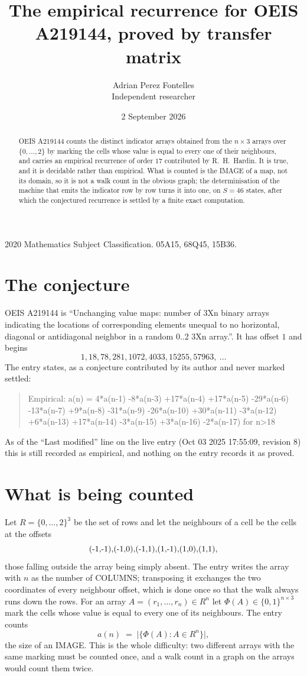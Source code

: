 \documentclass[11pt,a4paper]{article}
\title{The empirical recurrence for OEIS A219144, proved by transfer matrix}
\author{Adrian Perez Fontelles\\ \small Independent researcher}
\date{2 September 2026}
\theoremstyle{plain}
\theoremstyle{definition}
\begin{document}
\maketitle

\begin{abstract}
OEIS A219144 counts the distinct indicator arrays obtained from the $n\times3$ arrays over
$\{0,\dots,2\}$ by marking the cells whose value is equal to every one of their neighbours, and carries an
empirical recurrence of order $17$ contributed by R.~H.~Hardin. It is true, and it is
decidable rather than empirical. What is counted is the IMAGE of a map, not its domain, so it
is not a walk count in the obvious graph; the determinisation of the machine that emits the
indicator row by row turns it into one, on $S=46$ states, after which the conjectured
recurrence is settled by a finite exact computation.
\end{abstract}

\noindent\small 2020 Mathematics Subject Classification. 05A15, 68Q45, 15B36.\normalsize

\section{The conjecture}

OEIS A219144 is ``Unchanging value maps: number of 3Xn binary arrays indicating the locations of corresponding elements unequal to no horizontal, diagonal or antidiagonal neighbor in a random 0..2 3Xn array.''. It has offset $1$ and begins
\[
1, 18, 78, 281, 1072, 4033, 15255, 57963,\ \dots
\]
The entry states, as a conjecture contributed by its author and never marked settled:
\begin{quote}
Empirical: a(n) = 4*a(n-1) -8*a(n-3) +17*a(n-4) +17*a(n-5) -29*a(n-6) -13*a(n-7) +9*a(n-8) -31*a(n-9) -26*a(n-10) +30*a(n-11) -3*a(n-12) +6*a(n-13) +17*a(n-14) -3*a(n-15) +3*a(n-16) -2*a(n-17) for n>18
\end{quote}
As of the ``Last modified'' line on the live entry (Oct 03 2025 17:55:09, revision 8) this is still
recorded as empirical, and nothing on the entry records it as proved.

\section{What is being counted}

Let $R=\{0,\dots,2\}^{3}$ be the set of rows and let the neighbours of a cell be the
cells at the offsets
\[
$(-1,-1)$, $(-1,0)$, $(-1,1)$, $(1,-1)$, $(1,0)$, $(1,1)$,
\]
those falling outside the array being simply absent. The entry writes the array with $n$ as the number of COLUMNS; transposing it exchanges the two coordinates of every neighbour offset, which is done once so that the walk always runs down the rows. For an array
$A=(r_1,\dots,r_n)\in R^n$ let $\Phi(A)\in\{0,1\}^{n\times3}$ mark the cells whose value
is equal to every one of its neighbours. The entry counts
\[
a(n)\;=\;\bigl|\{\Phi(A):A\in R^n\}\bigr| ,
\]
the size of an IMAGE. This is the whole difficulty: two different arrays with the same marking
must be counted once, and a walk count in a graph on the arrays would count them twice.
\end{document}
